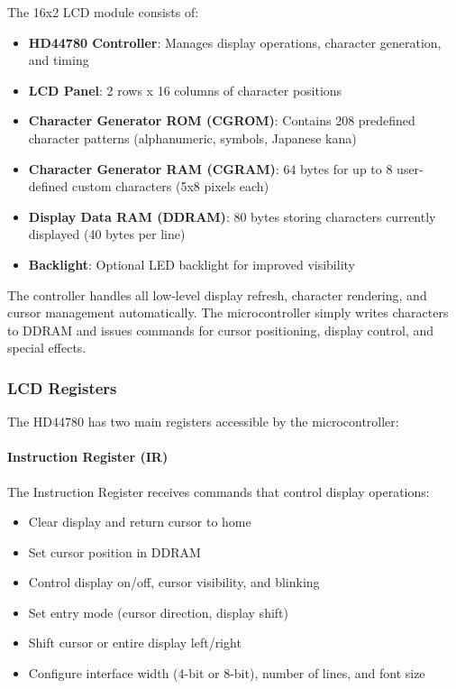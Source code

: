 The 16x2 LCD module consists of:
\begin{itemize}[nosep]
  \item \textbf{HD44780 Controller}: Manages display operations, character generation, and timing
  \item \textbf{LCD Panel}: 2 rows x 16 columns of character positions
  \item \textbf{Character Generator ROM (CGROM)}: Contains 208 predefined character patterns (alphanumeric, symbols, Japanese kana)
  \item \textbf{Character Generator RAM (CGRAM)}: 64 bytes for up to 8 user-defined custom characters (5x8 pixels each)
  \item \textbf{Display Data RAM (DDRAM)}: 80 bytes storing characters currently displayed (40 bytes per line)
  \item \textbf{Backlight}: Optional LED backlight for improved visibility
\end{itemize}

\noindent
The controller handles all low-level display refresh, character rendering, and cursor management automatically. The microcontroller simply writes characters to DDRAM and issues commands for cursor positioning, display control, and special effects.

\subsubsection{LCD Registers}

The HD44780 has two main registers accessible by the microcontroller:

\paragraph{Instruction Register (IR)}
The Instruction Register receives commands that control display operations:
\begin{itemize}[nosep]
  \item Clear display and return cursor to home
  \item Set cursor position in DDRAM
  \item Control display on/off, cursor visibility, and blinking
  \item Set entry mode (cursor direction, display shift)
  \item Shift cursor or entire display left/right
  \item Configure interface width (4-bit or 8-bit), number of lines, and font size
\end{itemize}

